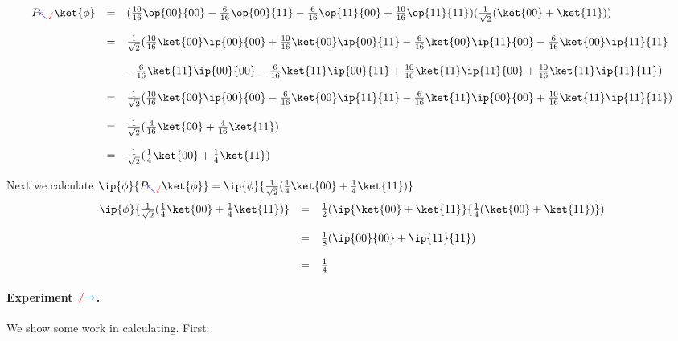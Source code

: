 \documentclass{article}
\newcommand{\xplus}{{\color{cyan}\rightarrow}}
\newcommand{\yplus}{{\color{blue}\nwarrow}}
\newcommand{\zplus}{{\color{red}\sswarrow}}
\theoremstyle{remark}
\def\srtt{\frac{1}{\sqrt{2}}}
\begin{document}
\[
    \begin{array}{rcl}
        P_{\yplus\zplus}\ket{\phi} &=& 
        (\frac{10}{16}\op{00}{00}
        - \frac{6}{16}\op{00}{11}
        - \frac{6}{16}\op{11}{00}
        + \frac{10}{16}\op{11}{11})(\srtt(\ket{00} + \ket{11}))
        \\ \\
        &=& \srtt(\frac{10}{16}\ket{00}\ip{00}{00}
        + \frac{10}{16}\ket{00}\ip{00}{11}
        - \frac{6}{16}\ket{00}\ip{11}{00}
        - \frac{6}{16}\ket{00}\ip{11}{11}
        \\ \\ 
        &&
        - \frac{6}{16}\ket{11}\ip{00}{00}
        - \frac{6}{16}\ket{11}\ip{00}{11}
        + \frac{10}{16}\ket{11}\ip{11}{00}
        + \frac{10}{16}\ket{11}\ip{11}{11}
        )
        \\ \\
        &=&
        \srtt(\frac{10}{16}\ket{00}\ip{00}{00}
        - \frac{6}{16}\ket{00}\ip{11}{11}
        - \frac{6}{16}\ket{11}\ip{00}{00}
        + \frac{10}{16}\ket{11}\ip{11}{11}
        )
        \\ \\
        &=&
        \srtt(\frac{4}{16}\ket{00} + \frac{4}{16}\ket{11})
        \\ \\
        &=&
        \srtt(\frac{1}{4}\ket{00} + \frac{1}{4}\ket{11})
    \end{array}
\]

Next we calculate 
$\ip{\phi}{P_{\yplus\zplus}\ket{\phi}} = \ip{\phi}{\srtt(\frac{1}{4}\ket{00} + \frac{1}{4}\ket{11})}$
\[
    \begin{array}{rcl}
        \ip{\phi}{\srtt(\frac{1}{4}\ket{00} + \frac{1}{4}\ket{11})}
        &=& \frac{1}{2}(\ip{\ket{00} + \ket{11}}{\frac{1}{4}(\ket{00} + \ket{11})})
        \\ \\
        &=& \frac{1}{8}(\ip{00}{00} + \ip{11}{11})
        \\  \\
        &=&
        \frac{1}{4}
    \end{array}
\]



\paragraph*{Experiment $\zplus\xplus$.} 
We show some work in calculating. First:
\end{document}
